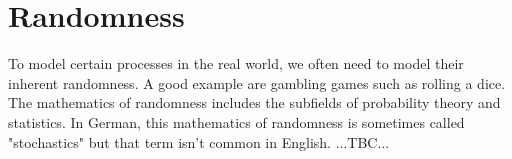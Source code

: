 \chapter{Randomness}
To model certain processes in the real world, we often need to model their inherent randomness. A good example are gambling games such as rolling a dice. The mathematics of randomness includes the subfields of probability theory and statistics. In German, this mathematics of randomness is sometimes called "stochastics" but that term isn't common in English. ...TBC...


\begin{comment}
-In German, we use the term "stochastics" as umbrella term for the mathematics of randomness. The
 field includes probability theory and statistics

\end{comment}
